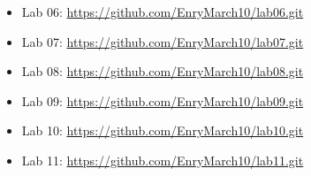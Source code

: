 \documentclass[12pt, a4paper]{report}
\begin{document}
\begin{itemize}
    \item Lab 06: \url{https://github.com/EnryMarch10/lab06.git}
    \item Lab 07: \url{https://github.com/EnryMarch10/lab07.git}
    \item Lab 08: \url{https://github.com/EnryMarch10/lab08.git}
    \item Lab 09: \url{https://github.com/EnryMarch10/lab09.git}
    \item Lab 10: \url{https://github.com/EnryMarch10/lab10.git}
    \item Lab 11: \url{https://github.com/EnryMarch10/lab11.git}
\end{itemize}

\printbibliography
\end{document}

